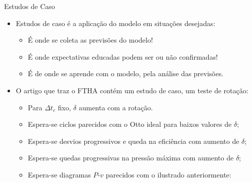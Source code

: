     \begin{frame}{Estudos de Caso}\vspace*{-2em}
        \begin{itemize}
            \item<1-> \alert{Estudos de caso} é a \alert{aplicação} do modelo em
                \alert{situações desejadas}:
                \begin{itemize}
                    \item<2-> É onde se coleta as \alert{previsões} do modelo!
                    \item<3-> É onde \alert{expectativas} educadas podem ser ou não confirmadas!
                    \item<4-> É de onde se \alert{aprende} com o modelo, pela \alert{análise das
                        previsões}.
                \end{itemize}
            \item<5-> O artigo que traz o FTHA contém um estudo de caso, um \alert{teste de
                rotação}:
                \begin{itemize}
                    \item<6-> Para $\Delta t_c$ fixo, \alert{$\delta$ aumenta com a rotação}.
                    \item<7-> \alert{Espera-se} ciclos parecidos com o Otto ideal para baixos
                        valores de $\delta$;
                    \item<8-> \alert{Espera-se} desvios progressivos e queda na eficiência com
                        aumento de $\delta$;
                    \item<9-> \alert{Espera-se} quedas progressivas na pressão máxima com
                        aumento de $\delta$;
                    \item<10-> \alert{Espera-se} diagramas $P$-$v$ parecidos com o ilustrado
                        anteriormente:
                \end{itemize}
        \end{itemize}
    \end{frame}

